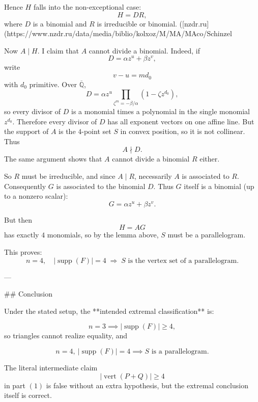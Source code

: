 Hence \(H\) falls into the non-exceptional case:
\[
H=DR,
\]
where \(D\) is a binomial and \(R\) is irreducible or binomial. ([nzdr.ru](https://www.nzdr.ru/data/media/biblio/kolxoz/M/MA/MAco/Schinzel%

Now \(A\mid H\). I claim that \(A\) cannot divide a binomial. Indeed, if
\[
D=\alpha z^u+\beta z^v,
\]
write
\[
v-u=md_0
\]
with \(d_0\) primitive. Over \(\overline{\mathbb Q}\),
\[
D=\alpha z^u\prod_{\zeta^m=-\beta/\alpha}(1-\zeta z^{d_0}),
\]
so every divisor of \(D\) is a monomial times a polynomial in the single monomial \(z^{d_0}\). Therefore every divisor of \(D\) has all exponent vectors on one affine line. But the support of \(A\) is the \(4\)-point set \(S\) in convex position, so it is not collinear. Thus
\[
A\nmid D.
\]
The same argument shows that \(A\) cannot divide a binomial \(R\) either.

So \(R\) must be irreducible, and since \(A\mid R\), necessarily \(A\) is associated to \(R\). Consequently \(G\) is associated to the binomial \(D\). Thus \(G\) itself is a binomial (up to a nonzero scalar):
\[
G=\alpha z^u+\beta z^v.
\]

But then
\[
H=AG
\]
has exactly \(4\) monomials, so by the lemma above, \(S\) must be a parallelogram.

This proves:
\[
n=4,\quad |\operatorname{supp}(F)|=4 \;\Longrightarrow\; S \text{ is the vertex set of a parallelogram}.
\]

---

## Conclusion

Under the stated setup, the **intended extremal classification** is:

\[
n=3 \implies |\operatorname{supp}(F)|\ge 4,
\]
so triangles cannot realize equality, and

\[
n=4,\ |\operatorname{supp}(F)|=4 \implies S \text{ is a parallelogram}.
\]

The literal intermediate claim
\[
|\operatorname{vert}(P+Q)|\ge 4
\]
in part \( (1) \) is false without an extra hypothesis, but the extremal conclusion itself is correct.
